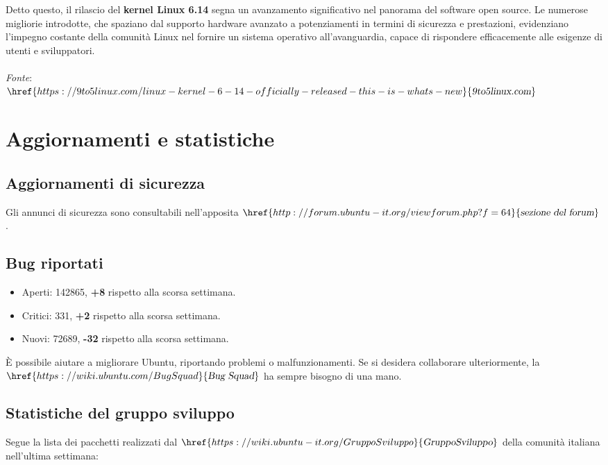 \documentclass[a4paper,twoside]{article}
\begin{document}
Detto questo, il rilascio del \textbf{kernel Linux 6.14} segna un avanzamento significativo nel panorama del software open source. Le numerose migliorie introdotte, che spaziano dal supporto hardware avanzato a potenziamenti in termini di sicurezza e prestazioni, evidenziano l'impegno costante della comunità Linux nel fornire un sistema operativo all'avanguardia, capace di rispondere efficacemente alle esigenze di utenti e sviluppatori.\\
\\
\textit{Fonte}:\\
$\href{https://9to5linux.com/linux-kernel-6-14-officially-released-this-is-whats-new}{\textsl{9to5linux.com}}$

\section{Aggiornamenti e statistiche}

\subsection{Aggiornamenti di sicurezza}
Gli annunci di sicurezza sono consultabili nell'apposita $\href{http://forum.ubuntu-it.org/viewforum.php?f=64}{\textsl{sezione del forum}}$.

\subsection{Bug riportati}

\begin{itemize}
\item Aperti: 142865, \textbf{+8} rispetto alla scorsa settimana.
\item Critici: 331, \textbf{+2} rispetto alla scorsa settimana.
\item Nuovi: 72689, \textbf{-32} rispetto alla scorsa settimana.
\end{itemize}

È possibile aiutare a migliorare Ubuntu, riportando problemi o malfunzionamenti. Se si desidera collaborare ulteriormente, la $\href{https://wiki.ubuntu.com/BugSquad}{\textsl{Bug Squad}}$ ha sempre bisogno di una mano.

\subsection{Statistiche del gruppo sviluppo}
Segue la lista dei pacchetti realizzati dal $\href{https://wiki.ubuntu-it.org/GruppoSviluppo}{\textsl{GruppoSviluppo}}$ della comunità italiana nell'ultima settimana:
\end{document}
